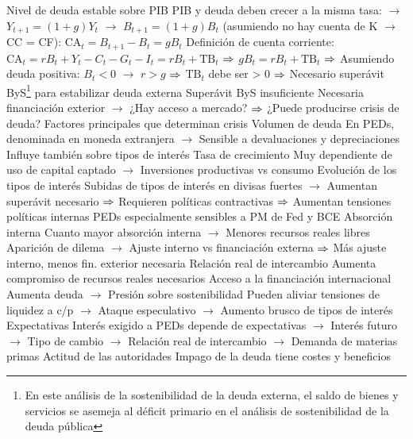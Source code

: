 \documentclass{nuevotema}
\begin{document}
\begin{esquemal}
				\4 Nivel de deuda estable sobre PIB
				\4[] PIB y deuda deben crecer a la misma tasa:
				\4[] $\to$ $Y_{t+1} = (1+g) Y_t$
				\4[] $\to$ $B_{t+1} = (1+g) B_t$
				\4[] (asumiendo no hay cuenta de K $\to$ CC = CF):
				\4[] $\text{CA}_t = B_{t+1} - B_t = g B_t$
				\4[] Definición de cuenta corriente:
				\4[] $\text{CA}_t = rB_t + Y_t - C_t - G_t - I_t = rB_t + \text{TB}_t$
				\4[] $\Rightarrow$ $g B_t = r B_t + \text{TB}_t$
				\4[] $\Rightarrow$ 
				\4[] Asumiendo deuda positiva: $B_t < 0$
				\4[] $\to$ $r>g$ $\Rightarrow$ $\text{TB}_t$ debe ser > 0
				\4[] $\Rightarrow$ Necesario superávit ByS\footnote{En este análisis de la sostenibilidad de la deuda externa, el saldo de bienes y servicios se asemeja al déficit primario en el análisis de sostenibilidad de la deuda pública} para estabilizar deuda externa
				\4 Superávit ByS insuficiente
				\4[] Necesaria financiación exterior
				\4[] $\to$ ¿Hay acceso a mercado?
				\4[] $\Rightarrow$ ¿Puede producirse crisis de deuda?
			\3 Factores principales que determinan crisis
				\4 Volumen de deuda
				\4[] En PEDs, denominada en moneda extranjera
				\4[] $\to$ Sensible a devaluaciones y depreciaciones
				\4[] Influye también sobre tipos de interés
				\4 Tasa de crecimiento
				\4[] Muy dependiente de uso de capital captado
				\4[] $\to$ Inversiones productivas vs consumo
				\4 Evolución de los tipos de interés
				\4[] Subidas de tipos de interés en divisas fuertes
				\4[] $\to$ Aumentan superávit necesario
				\4[] $\Rightarrow$ Requieren políticas contractivas
				\4[] $\Rightarrow$ Aumentan tensiones políticas internas
				\4[] PEDs especialmente sensibles a PM de Fed y BCE
				\4 Absorción interna
				\4[] Cuanto mayor absorción interna
				\4[] $\to$ Menores recursos reales libres
				\4[] Aparición de dilema
				\4[] $\to$ Ajuste interno vs financiación externa
				\4[] $\Rightarrow$ Más ajuste interno, menos fin. exterior necesaria
				\4 Relación real de intercambio
				\4[] Aumenta compromiso de recursos reales necesarios
				\4 Acceso a la financiación internacional
				\4[] Aumenta deuda
				\4[] $\to$ Presión sobre sostenibilidad
				\4[] Pueden aliviar tensiones de liquidez a c/p
				\4[] $\to$ Ataque especulativo
				\4[] $\to$ Aumento brusco de tipos de interés
				\4 Expectativas
				\4[] Interés exigido a PEDs depende de expectativas
				\4[] $\to$ Interés futuro
				\4[] $\to$ Tipo de cambio
				\4[] $\to$ Relación real de intercambio
				\4[] $\to$ Demanda de materias primas
				\4 Actitud de las autoridades
				\4[] Impago de la deuda tiene costes y beneficios

\end{esquemal}
\end{document}
